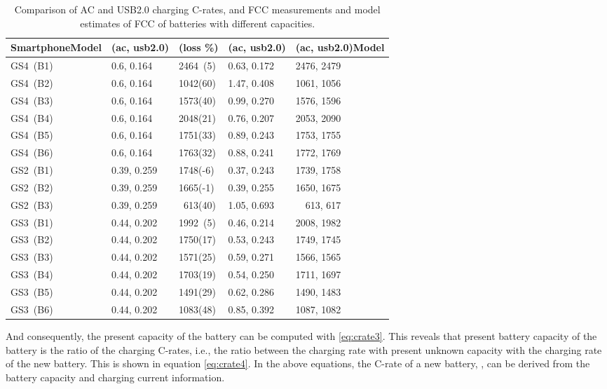 \documentclass[journal]{IEEEtran}
\begin{document}
\begin{table}[t]
\begin{center}
  \caption{Comparison of AC and USB2.0 charging C-rates, and FCC measurements and model estimates of FCC of batteries with different capacities.}

\begin{tabular}{|p{11mm}|p{12mm}|p{10mm}|p{12mm}|p{12mm}|}
      \hline      
       Smartphone\break Model&\break(ac, usb2.0)&\break (loss \%)& \break(ac, usb2.0) & \break(ac, usb2.0)\break Model\\\hline
       GS4~(B1) & 0.6, 0.164& 2464~(5)& 0.63, 0.172 & 2476, 2479\\\hline 
       GS4~(B2) & 0.6, 0.164& 1042(60)&1.47, 0.408  &1061, 1056\\\hline
       GS4~(B3) & 0.6, 0.164& 1573(40)& 0.99, 0.270&1576, 1596\\\hline
       GS4~(B4) & 0.6, 0.164& 2048(21)& 0.76, 0.207 & 2053, 2090\\\hline
       GS4~(B5) & 0.6, 0.164& 1751(33)& 0.89, 0.243&1753, 1755\\\hline
       GS4~(B6) & 0.6, 0.164& 1763(32)& 0.88, 0.241 & 1772, 1769\\\hline

       GS2~(B1) & 0.39, 0.259& 1748(-6)&0.37, 0.243& 1739, 1758\\\hline 
       GS2~(B2) & 0.39, 0.259& 1665(-1)& 0.39, 0.255& 1650, 1675\\\hline 
       GS2~(B3)& 0.39, 0.259& ~613(40)& 1.05, 0.693& ~~613, 617\\\hline
       GS3~(B1)& 0.44, 0.202& 1992~(5)& 0.46, 0.214&2008, 1982\\\hline 
       GS3~(B2)& 0.44, 0.202& 1750(17)&0.53, 0.243& 1749, 1745\\\hline 
       GS3~(B3) & 0.44, 0.202& 1571(25)&0.59, 0.271&1566, 1565\\\hline 
       GS3~(B4) & 0.44, 0.202& 1703(19)&0.54, 0.250& 1711, 1697\\\hline
       GS3~(B5) & 0.44, 0.202& 1491(29)&0.62, 0.286&1490, 1483\\\hline
       GS3~(B6)& 0.44, 0.202& 1083(48)&0.85, 0.392&1087, 1082\\\hline
  \end{tabular}
\label{tab:rates_info}
    \end{center}
 
\end{table}


And consequently, the present capacity of the battery can be computed with \eqref{eq:crate3}. This reveals that present battery capacity of the battery is the ratio of the charging C-rates, i.e.,  the ratio between the charging rate with present unknown capacity with the charging rate of the new battery. This is shown in equation \eqref{eq:crate4}. In the above equations, the C-rate of a new battery, , can be derived from the battery capacity and charging current information. 
\end{document}
